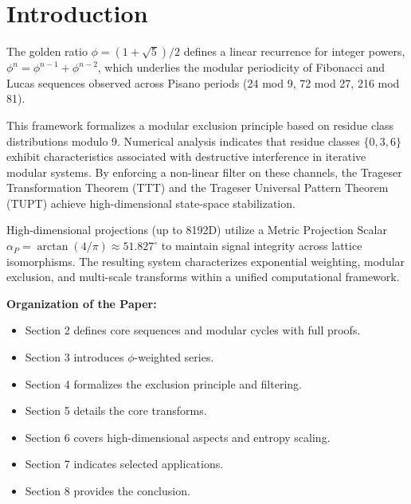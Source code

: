\section{Introduction}

The golden ratio $\phi = (1 + \sqrt{5})/2$ defines a linear recurrence for integer powers, $\phi^n = \phi^{n-1} + \phi^{n-2}$, which underlies the modular periodicity of Fibonacci and Lucas sequences observed across Pisano periods (24 mod 9, 72 mod 27, 216 mod 81).

This framework formalizes a modular exclusion principle based on residue class distributions modulo 9. Numerical analysis indicates that residue classes $\{0, 3, 6\}$ exhibit characteristics associated with destructive interference in iterative modular systems. By enforcing a non-linear filter on these channels, the Trageser Transformation Theorem (TTT) and the Trageser Universal Pattern Theorem (TUPT) achieve high-dimensional state-space stabilization.

High-dimensional projections (up to 8192D) utilize a Metric Projection Scalar $\alpha_P = \arctan(4/\pi) \approx 51.827^\circ$ to maintain signal integrity across lattice isomorphisms. The resulting system characterizes exponential weighting, modular exclusion, and multi-scale transforms within a unified computational framework.

\vspace{1em}
\noindent\textbf{Organization of the Paper:} 
\begin{itemize}[leftmargin=*, label=\textcolor{nrcblue}{\textbullet}]
\item \textsf{Section 2} defines core sequences and modular cycles with full proofs.
\item \textsf{Section 3} introduces $\phi$-weighted series.
\item \textsf{Section 4} formalizes the exclusion principle and filtering.
\item \textsf{Section 5} details the core transforms.
\item \textsf{Section 6} covers high-dimensional aspects and entropy scaling.
\item \textsf{Section 7} indicates selected applications.
\item \textsf{Section 8} provides the conclusion.
\end{itemize}